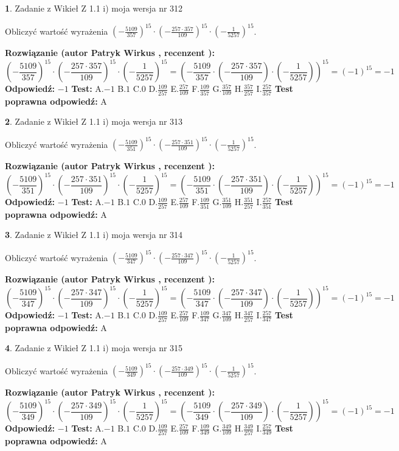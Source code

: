 \documentclass[12pt, a4paper]{article}
\theoremstyle{definition} %
\newtheorem{zad}{}
\newcommand{\zadStart}[1]{\begin{zad}#1\newline}
\newcommand{\zadStop}{\end{zad}}
\newcommand{\rozwStart}[2]{\noindent \textbf{Rozwiązanie (autor #1 , recenzent #2): }\newline}
\newcommand{\rozwStop}{\newline}
\newcommand{\odpStart}{\noindent \textbf{Odpowiedź:}\newline}
\newcommand{\odpStop}{\newline}
\newcommand{\testStart}{\noindent \textbf{Test:}\newline}
\newcommand{\testStop}{\newline}
\newcommand{\kluczStart}{\noindent \textbf{Test poprawna odpowiedź:}\newline}
\newcommand{\kluczStop}{\newline}
\begin{document}
\zadStart{Zadanie z Wikieł Z 1.1 i) moja wersja nr 312}

Obliczyć wartość wyrażenia $(-\frac{5109}{357})^{15} \cdot (-\frac{257 \cdot 357}{109})^{15} \cdot (-\frac{1}{5257})^{15}$.
\zadStop
\rozwStart{Patryk Wirkus}{}
$$(-\frac{5109}{357})^{15} \cdot (-\frac{257 \cdot 357}{109})^{15} \cdot (-\frac{1}{5257})^{15} = (-\frac{5109}{357} \cdot (-\frac{257 \cdot 357}{109}) \cdot (-\frac{1}{5257}))^{15} = (-1)^{15} = -1$$
\rozwStop
\odpStart
$-1$
\odpStop
\testStart
A.$-1$ B.$1$ C.$0$ D.$\frac{109}{257}$ E.$\frac{257}{109}$
F.$\frac{109}{357}$ G.$\frac{357}{109}$
H.$\frac{357}{257}$
I.$\frac{257}{357}$
\testStop
\kluczStart
A
\kluczStop



\zadStart{Zadanie z Wikieł Z 1.1 i) moja wersja nr 313}

Obliczyć wartość wyrażenia $(-\frac{5109}{351})^{15} \cdot (-\frac{257 \cdot 351}{109})^{15} \cdot (-\frac{1}{5257})^{15}$.
\zadStop
\rozwStart{Patryk Wirkus}{}
$$(-\frac{5109}{351})^{15} \cdot (-\frac{257 \cdot 351}{109})^{15} \cdot (-\frac{1}{5257})^{15} = (-\frac{5109}{351} \cdot (-\frac{257 \cdot 351}{109}) \cdot (-\frac{1}{5257}))^{15} = (-1)^{15} = -1$$
\rozwStop
\odpStart
$-1$
\odpStop
\testStart
A.$-1$ B.$1$ C.$0$ D.$\frac{109}{257}$ E.$\frac{257}{109}$
F.$\frac{109}{351}$ G.$\frac{351}{109}$
H.$\frac{351}{257}$
I.$\frac{257}{351}$
\testStop
\kluczStart
A
\kluczStop



\zadStart{Zadanie z Wikieł Z 1.1 i) moja wersja nr 314}

Obliczyć wartość wyrażenia $(-\frac{5109}{347})^{15} \cdot (-\frac{257 \cdot 347}{109})^{15} \cdot (-\frac{1}{5257})^{15}$.
\zadStop
\rozwStart{Patryk Wirkus}{}
$$(-\frac{5109}{347})^{15} \cdot (-\frac{257 \cdot 347}{109})^{15} \cdot (-\frac{1}{5257})^{15} = (-\frac{5109}{347} \cdot (-\frac{257 \cdot 347}{109}) \cdot (-\frac{1}{5257}))^{15} = (-1)^{15} = -1$$
\rozwStop
\odpStart
$-1$
\odpStop
\testStart
A.$-1$ B.$1$ C.$0$ D.$\frac{109}{257}$ E.$\frac{257}{109}$
F.$\frac{109}{347}$ G.$\frac{347}{109}$
H.$\frac{347}{257}$
I.$\frac{257}{347}$
\testStop
\kluczStart
A
\kluczStop



\zadStart{Zadanie z Wikieł Z 1.1 i) moja wersja nr 315}

Obliczyć wartość wyrażenia $(-\frac{5109}{349})^{15} \cdot (-\frac{257 \cdot 349}{109})^{15} \cdot (-\frac{1}{5257})^{15}$.
\zadStop
\rozwStart{Patryk Wirkus}{}
$$(-\frac{5109}{349})^{15} \cdot (-\frac{257 \cdot 349}{109})^{15} \cdot (-\frac{1}{5257})^{15} = (-\frac{5109}{349} \cdot (-\frac{257 \cdot 349}{109}) \cdot (-\frac{1}{5257}))^{15} = (-1)^{15} = -1$$
\rozwStop
\odpStart
$-1$
\odpStop
\testStart
A.$-1$ B.$1$ C.$0$ D.$\frac{109}{257}$ E.$\frac{257}{109}$
F.$\frac{109}{349}$ G.$\frac{349}{109}$
H.$\frac{349}{257}$
I.$\frac{257}{349}$
\testStop
\kluczStart
A
\kluczStop
\end{document}
